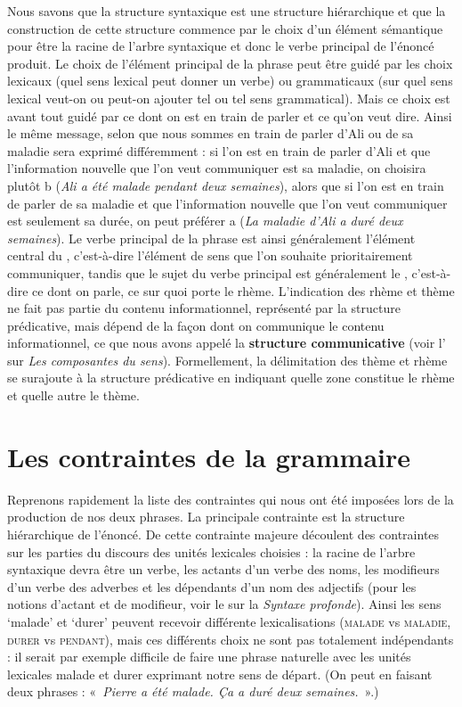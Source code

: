 Nous savons que la structure syntaxique est une structure hiérarchique et que la construction de cette structure commence par le choix d’un élément sémantique pour être la racine de l’arbre syntaxique et donc le verbe principal de l’énoncé produit. Le choix de l’élément principal de la phrase peut être guidé par les choix lexicaux (quel sens lexical peut donner un verbe) ou grammaticaux (sur quel sens lexical veut-on ou peut-on ajouter tel ou tel sens grammatical). Mais ce choix est avant tout guidé par ce dont on est en train de parler et ce qu’on veut dire. Ainsi le même message, selon que nous sommes en train de parler d’Ali ou de sa maladie sera exprimé différemment : si l’on est en train de parler d’Ali et que l’information nouvelle que l’on veut communiquer est sa maladie, on choisira plutôt b (\textit{Ali a été malade pendant deux semaines}), alors que si l’on est en train de parler de sa maladie et que l’information nouvelle que l’on veut communiquer est seulement sa durée, on peut préférer a (\textit{La maladie d’Ali a duré deux semaines}). Le verbe principal de la phrase est ainsi généralement l’élément central du , c’est-à-dire l’élément de sens que l’on souhaite prioritairement communiquer, tandis que le sujet du verbe principal est généralement le , c’est-à-dire ce dont on parle, ce sur quoi porte le rhème. L’indication des rhème et thème ne fait pas partie du contenu informationnel, représenté par la structure prédicative, mais dépend de la façon dont on communique le contenu informationnel, ce que nous avons appelé la \textbf{structure communicative} (voir l’ sur \textit{Les composantes du sens}). Formellement, la délimitation des thème et rhème se surajoute à la structure prédicative en indiquant quelle zone constitue le rhème et quelle autre le thème.

\section{Les contraintes de la grammaire}\label{sec:1.2.14}

Reprenons rapidement la liste des contraintes qui nous ont été imposées lors de la production de nos deux phrases. La principale contrainte est la structure hiérarchique de l’énoncé. De cette contrainte majeure découlent des contraintes sur les parties du discours des unités lexicales choisies : la racine de l’arbre syntaxique devra être un verbe, les actants d’un verbe des noms, les modifieurs d’un verbe des adverbes et les dépendants d’un nom des adjectifs (pour les notions d’actant et de modifieur, voir le  sur la \textit{Syntaxe profonde}). Ainsi les sens ‘malade’ et ‘durer’ peuvent recevoir différente lexicalisations (\textsc{malade} vs \textsc{maladie}, \textsc{durer} vs \textsc{pendant}), mais ces différents choix ne sont pas totalement indépendants : il serait par exemple difficile de faire une phrase naturelle avec les unités lexicales malade et durer exprimant notre sens de départ. (On peut en faisant deux phrases : «~\textit{Pierre a été malade. Ça a duré deux semaines.}~».)

